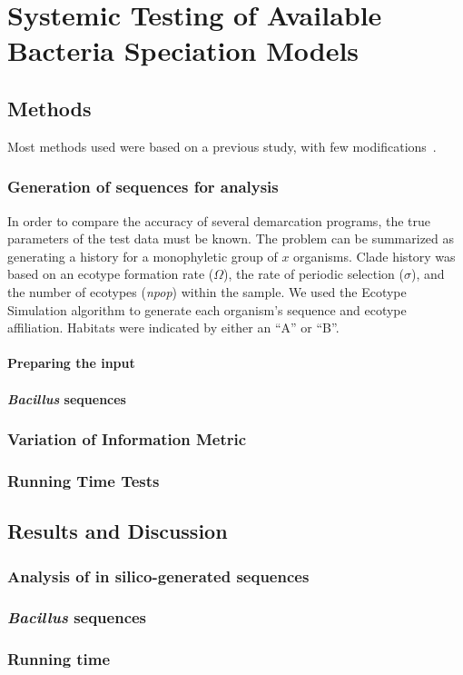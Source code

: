 \chapter{Systemic Testing of Available Bacteria Speciation Models}
\section{Methods}
Most methods used were based on a previous study, with few modifications~\cite{carlo}.
\subsection{Generation of sequences for analysis}
In order to compare the accuracy of several demarcation programs, the true parameters of the test data must be known.
The problem can be summarized as generating a history for a monophyletic group of $x$ organisms.
Clade history was based on an ecotype formation rate ($\Omega$), the rate of periodic selection ($\sigma$), and the number of ecotypes (\emph{npop}) within the sample.
We used the Ecotype Simulation algorithm to generate each organism's sequence and ecotype affiliation.
Habitats were indicated by either an ``A'' or ``B''.

\subsubsection{Preparing the input}


\subsubsection{\emph{Bacillus} sequences}
\subsection{Variation of Information Metric}
\subsection{Running Time Tests}
\section{Results and Discussion}
\subsection{Analysis of in silico-generated sequences}
\subsection{\emph{Bacillus} sequences}
\subsection{Running time}